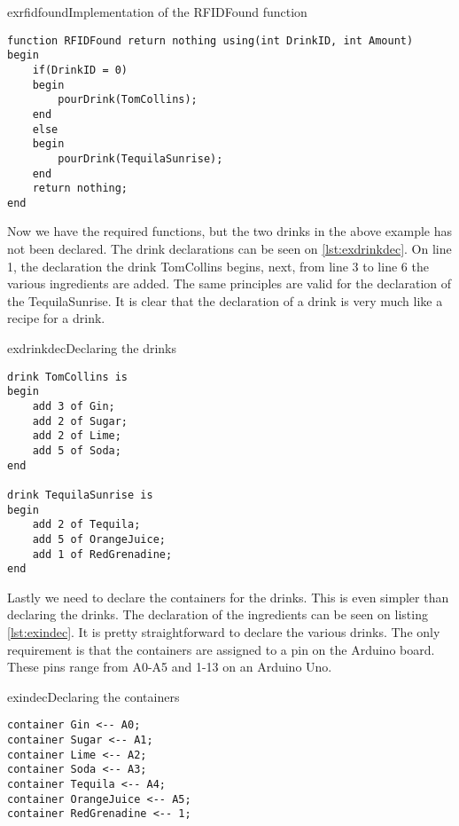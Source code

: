 \begin{code}{exrfidfound}{Implementation of the RFIDFound function}
\begin{lstlisting}
function RFIDFound return nothing using(int DrinkID, int Amount)
begin
	if(DrinkID = 0)
	begin
		pourDrink(TomCollins);
	end
	else
	begin
		pourDrink(TequilaSunrise);
	end
	return nothing;
end
\end{lstlisting}
\end{code}

Now we have the required functions, but the two drinks in the above example has not been declared. The drink declarations can be seen on \ref{lst:exdrinkdec}. On line 1, the declaration the drink TomCollins begins, next, from line 3 to line 6 the various ingredients are added. The same principles are valid for the declaration of the TequilaSunrise. It is clear that the declaration of a drink is very much like a recipe for a drink. 

\begin{code}{exdrinkdec}{Declaring the drinks}
\begin{lstlisting}
drink TomCollins is
begin
	add 3 of Gin;
	add 2 of Sugar;
	add 2 of Lime;
	add 5 of Soda;
end

drink TequilaSunrise is 
begin
	add 2 of Tequila;
	add 5 of OrangeJuice;
	add 1 of RedGrenadine;
end
\end{lstlisting}
\end{code}

Lastly we need to declare the containers for the drinks. This is even simpler than declaring the drinks. The declaration of the ingredients can be seen on listing \ref{lst:exindec}. It is pretty straightforward to declare the various drinks. The only requirement is that the containers are assigned to a pin on the Arduino board. These pins range from A0-A5 and 1-13 on an Arduino Uno.

\begin{code}{exindec}{Declaring the containers}
\begin{lstlisting}
container Gin <-- A0;
container Sugar <-- A1;
container Lime <-- A2;
container Soda <-- A3;
container Tequila <-- A4;
container OrangeJuice <-- A5;
container RedGrenadine <-- 1;
\end{lstlisting}
\end{code}